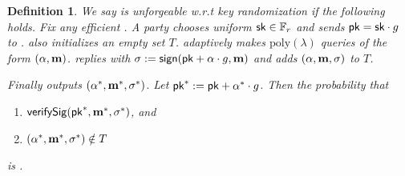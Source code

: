 \documentclass[11pt]{article}
\numberwithin{equation}{section} %
\numberwithin{figure}{section} %
\newtheorem{dfn}[thm]{Definition}
\newcommand{\set}[1]{\ensuremath{\left\{#1\right\}}\xspace}
\newcommand{\eps}{\ensuremath{\epsilon}\xspace}
\newcommand{\poly}{\ensuremath{\mathrm{poly}(\lambda)}\xspace}
\begin{document}
\begin{dfn}
% 
% 
% 
% 

%    

We say \sigscheme is \emph{unforgeable w.r.t key randomization} if the following holds.
Fix any efficient \adv.
A party \oracle chooses uniform $\mathsf{sk}\in {\mathbb F}_r$ and sends $\mathsf{pk} = \mathsf{sk}\cdot g$ to \adv.
\oracle also initializes an empty set $T$.
\adv adaptively makes \poly queries of the form $(\alpha,\mathbf m)$.
\oracle replies with $\sigma:= \mathsf{sign}(\mathsf{pk}+\alpha\cdot g, \mathbf m)$
and adds $(\alpha,\mathbf m,\sigma)$ to $T$.

Finally \adv outputs $(\alpha^*,\mathbf m^*,\sigma^*)$.
Let $\mathsf{pk}^*:= \mathsf{pk}+\alpha^*\cdot g$.
 Then the probability that 
  \begin{enumerate}
   \item $\mathsf{verifySig}(\mathsf{pk}^*,\mathbf m^*,\sigma^*)$, and 
   \item $(\alpha^*,\mathbf m^*,\sigma^*)\notin T$
  \end{enumerate}
is \negl.
\end{dfn}
\end{document}
